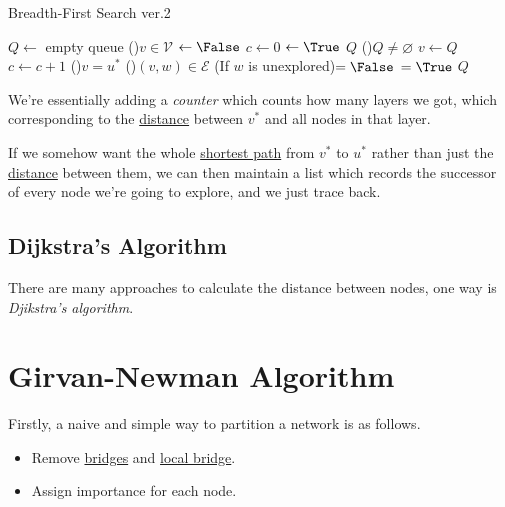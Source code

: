 \begin{algorithm}[H]\label{algo:BFS-2}
	\DontPrintSemicolon{}
	\caption{Breadth-First Search ver.2}
	\BlankLine
	\(Q\gets \) empty queue
	\For(){\(v\in \mathcal{V} \)}{
		\(\gets \False\)
	}
	\(c\gets 0\) 
	\;
	\(\gets \True\) 
	\(Q\)\;
	\;
	\While(){\(Q\neq \varnothing \)}{
		\(v\gets Q\)\pop{}\;
		\(c\gets c + 1\)\;
		\If(){\(v = u^{\ast} \)}{
		}
		\For(){\((v, w)\in\mathcal{E}\)}{
			\If(If \(w\) is unexplored){\(= \False\)}{
				\(=\True\)
				\(Q\)\;
			}
		}
	}
	\Return{}\;
\end{algorithm}

\begin{intuition}[Counter]
	We're essentially adding a \emph{counter} which counts how many layers we got, which corresponding to the \hyperref[def:distance-between-nodes]{distance} between
	\(v^{\ast} \) and all nodes in that layer.
\end{intuition}

\begin{remark}
	If we somehow want the whole \hyperref[def:shortest-path]{shortest path} from \(v^{\ast} \) to \(u^{\ast} \) rather than just the \hyperref[def:distance-between-nodes]{distance} between them, we can then maintain a list which records the successor of every node we're going to explore, and we just trace back.
\end{remark}

\subsection{Dijkstra's Algorithm}
There are many approaches to calculate the distance between nodes, one way is \emph{Djikstra's algorithm}.

\section{Girvan-Newman Algorithm}
Firstly, a naive and simple way to partition a network is as follows.
\begin{itemize}
	\item Remove \hyperref[def:bridge]{bridges} and \hyperref[def:local-bridge]{local bridge}.
	\item Assign importance for each node.
\end{itemize}

